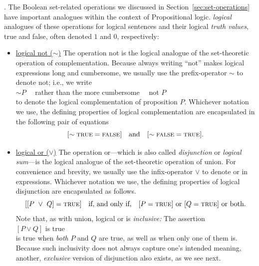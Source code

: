 .
%
The Boolean set-related operations we discussed in
Section~\ref{sec:set-operations} have important
analogues within the context of Propositional logic.
 {\em logical} analogues of these operations for logical
sentences and their logical {\em truth values},
%
{\sc true} and {\sc false}, often denoted $1$ and $0$, respectively:
\begin{itemize}
\item
\underline{logical {\small\sf not} ($\sim$)}
The operation {\small\sf not} is the logical analogue of the
set-theoretic operation of complementation.  Because always writing
``{\small\sf not}'' makes logical expressions long and cumbersome, we
usually use the prefix-operator $\sim$ to denote {\small\sf not};
i.e., we write \\
\hspace*{.35in}$\sim P$ \ \ rather than the more cumbersome
\ \ {\small\sf not} $P$ \\
to denote the logical complementation of proposition $P$.  Whichever
notation we use, the defining properties of logical complementation
are encapsulated in the following pair of equations
\[
[\sim \mbox{\sc true} = \mbox{\sc false}] \ \ \mbox{ and } \ \ [\sim
  \mbox{\sc false} = \mbox{\sc true}].
\]

\item
\underline{logical {\small\sf or} ($\vee$)}
%
The operation {\small\sf or}---which is also called {\em disjunction}
or {\em logical sum}---is the logical analogue of the set-theoretic
operation of union.  For convenience and brevity, we usually use the
infix-operator $\vee$ to denote {\small\sf or} in expressions.
Whichever notation we use, the defining properties of logical
disjunction are encapsulated as follows.
\[
[[P \ \vee \ Q] =  \mbox{\sc true}] \ \ \mbox{ if, and only if, } \ \ 
[P = \mbox{\sc true}] \mbox{ or }
[Q = \mbox{\sc true}] \mbox{ or both}.
\]
Note that, as with union, logical {\small\sf or} is {\em inclusive:}
The assertion \\
\hspace*{.35in}$[P \vee Q]$ is \mbox{\sc true} \\
%
is true when {\em both} $P$ and $Q$ are true, as well as when only one
of them is.  Because such inclusivity does not always capture one's
intended meaning, another, {\em exclusive} version of disjunction also
exists, as we see next.


\end{itemize}
